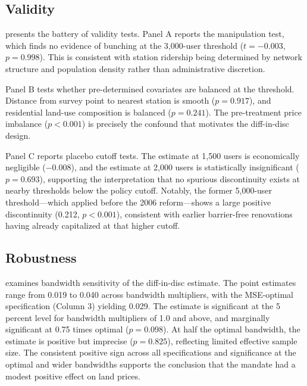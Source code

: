 \documentclass[12pt]{article}
\begin{document}


\subsection{Validity}

 presents the battery of validity tests. Panel A reports the \citet{cattaneo2020density} manipulation test, which finds no evidence of bunching at the 3,000-user threshold ($t = -0.003$, $p = 0.998$). This is consistent with station ridership being determined by network structure and population density rather than administrative discretion.

Panel B tests whether pre-determined covariates are balanced at the threshold. Distance from survey point to nearest station is smooth ($p = 0.917$), and residential land-use composition is balanced ($p = 0.241$). The pre-treatment price imbalance ($p < 0.001$) is precisely the confound that motivates the diff-in-disc design.

Panel C reports placebo cutoff tests. The estimate at 1,500 users is economically negligible ($-0.008$), and the estimate at 2,000 users is statistically insignificant ($p = 0.693$), supporting the interpretation that no spurious discontinuity exists at nearby thresholds below the policy cutoff. Notably, the former 5,000-user threshold---which applied before the 2006 reform---shows a large positive discontinuity (0.212, $p < 0.001$), consistent with earlier barrier-free renovations having already capitalized at that higher cutoff.



\subsection{Robustness}

 examines bandwidth sensitivity of the diff-in-disc estimate. The point estimates range from 0.019 to 0.040 across bandwidth multipliers, with the MSE-optimal specification (Column 3) yielding 0.029. The estimate is significant at the 5 percent level for bandwidth multipliers of 1.0 and above, and marginally significant at 0.75 times optimal ($p = 0.098$). At half the optimal bandwidth, the estimate is positive but imprecise ($p = 0.825$), reflecting limited effective sample size. The consistent positive sign across all specifications and significance at the optimal and wider bandwidths supports the conclusion that the mandate had a modest positive effect on land prices.
\end{document}
